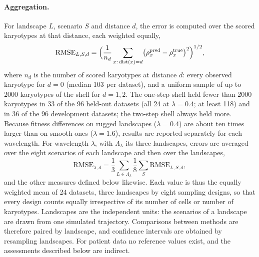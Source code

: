 \documentclass[11pt]{article}
\begin{document}
\paragraph{Aggregation.}
For landscape $L$, scenario $S$ and distance $d$, the error is computed over
the scored karyotypes at that distance, each weighted equally,
\begin{equation}
  \mathrm{RMSE}_{L,S,d}=\Bigl(\frac{1}{n_d}\sum_{x:\,\mathrm{dist}(x)=d}
  \bigl(\rho^{\mathrm{pred}}_x-\rho^{\mathrm{true}}_x\bigr)^2\Bigr)^{1/2},
  \label{eq:rmse}
\end{equation}
where $n_d$ is the number of scored karyotypes at distance $d$: every
observed karyotype for $d=0$ (median 103 per dataset), and a uniform sample of
up to 2000 karyotypes of the shell for $d=1,2$. The one-step shell held fewer
than 2000 karyotypes in 33 of the 96 held-out datasets (all 24 at
$\lambda=0.4$; at least 118) and in 36 of the 96 development datasets; the
two-step shell always held more. Because fitness differences on rugged landscapes
($\lambda=0.4$) are about ten times larger than on smooth ones
($\lambda=1.6$), results are reported separately for each wavelength. For
wavelength $\lambda$, with $\Lambda_\lambda$ its three landscapes, errors are
averaged over the eight scenarios of each landscape and then over the
landscapes,
\begin{equation}
  \mathrm{RMSE}_{\lambda,d}=\frac{1}{3}\sum_{L\in\Lambda_\lambda}\frac{1}{8}\sum_S\mathrm{RMSE}_{L,S,d},
  \label{eq:rmse-pooled}
\end{equation}
and the other measures defined below likewise. Each value is thus the
equally weighted mean of 24 datasets, three landscapes by eight sampling
designs, so that every design counts equally irrespective of its number of cells
or number of karyotypes. Landscapes are the independent units: the scenarios of a landscape are drawn from one simulated trajectory.
Comparisons between methods are therefore paired by landscape, and confidence
intervals are obtained by resampling landscapes. For patient data no
reference values exist, and the assessments described below are indirect.
\end{document}
